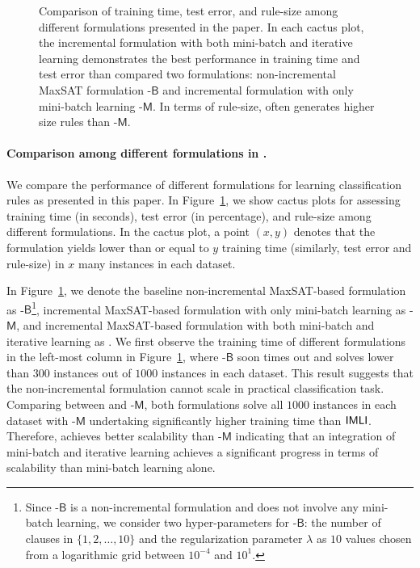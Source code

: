 \begin{figure}[!t]
	
	\caption[Training time, test error, and rule-size of different formulations in {\imli}]{Comparison of training time, test error, and rule-size among different formulations presented in the paper. In each cactus plot, the incremental formulation {\imli} with both mini-batch and iterative learning demonstrates the best performance in training time and test error than compared two formulations: non-incremental MaxSAT formulation {\imli}-$\mathsf{B}$ and incremental formulation with only mini-batch learning {\imli}-$\mathsf{M}$. In terms of rule-size, {\imli} often generates higher size rules than {\imli}-$\mathsf{M}$.}
	\label{interpretability_imli_fig:different_formulations}
\end{figure}



\paragraph{Comparison among different formulations in {\imli}.}  We compare the performance of different formulations for learning classification rules as presented in this paper. In Figure~\ref{interpretability_imli_fig:different_formulations}, we show cactus plots for assessing training time (in seconds), test error (in percentage), and rule-size among different formulations. In the cactus plot, a point $ (x,y) $ denotes that the formulation yields lower than or equal to $ y $ training time (similarly, test error and rule-size) in $ x $ many instances in each dataset.

In Figure~\ref{interpretability_imli_fig:different_formulations}, we denote the baseline non-incremental MaxSAT-based formulation as {\imli}-$\mathsf{B}$\footnote{Since  {\imli}-$\mathsf{B}$ is a non-incremental formulation and does not involve any mini-batch learning, we consider two hyper-parameters for {\imli}-$\mathsf{B}$: the number of clauses in $ \{1, 2, \dots, 10\} $ and the regularization parameter $ \lambda $ as $ 10 $ values chosen from a logarithmic grid between $ 10^{-4} $ and $ 10^1 $.}, incremental MaxSAT-based formulation with only mini-batch learning as {\imli}-$\mathsf{M}$, and incremental MaxSAT-based formulation with both mini-batch and iterative learning as {\imli}.  We first observe the training time of different formulations in the left-most column in Figure~\ref{interpretability_imli_fig:different_formulations}, where {\imli}-$\mathsf{B}$ soon times out and solves lower than $ 300 $ instances out of $ 1000 $ instances in each dataset. This result suggests that the non-incremental formulation cannot scale in practical classification task. Comparing between {\imli} and {\imli}-$\mathsf{M}$, both formulations solve all $ 1000 $ instances in each dataset with {\imli}-$\mathsf{M}$ undertaking significantly higher training time than $ {\mathsf{IMLI}} $.  Therefore, {\imli} achieves better scalability than {\imli}-$\mathsf{M}$ indicating that an integration of mini-batch and iterative learning achieves a significant progress in terms of scalability than mini-batch learning alone. 

